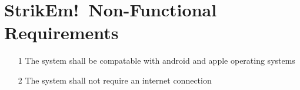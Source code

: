 \documentclass[11pt]{article}
\begin{document}
\section{StrikEm!\ Non-Functional Requirements}
\begin{enumerate}
\item[1] The system shall be compatable with android and apple operating systems
\item[2] The system shall not require an internet connection
\end{enumerate}
\end{document}
